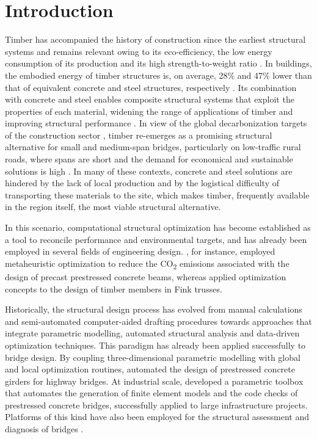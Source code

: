 \section{Introduction}\label{sec:introducao}

Timber has accompanied the history of construction since the earliest structural systems and remains relevant owing to its eco-efficiency, the low energy consumption of its production and its high strength-to-weight ratio \parencite{FRAGA2025}.
In buildings, the embodied energy of timber structures is, on average, 28\% and 47\% lower than that of equivalent concrete and steel structures, respectively \parencite{Schenk2022}.
Its combination with concrete and steel enables composite structural systems that exploit the properties of each material, widening the range of applications of timber and improving structural performance \parencite{PASTORI2022}.
In view of the global decarbonization targets of the construction sector \parencite{Li2025}, timber re-emerges as a promising structural alternative for small and medium-span bridges, particularly on low-traffic rural roads, where spans are short and the demand for economical and sustainable solutions is high \parencite{Milani2020}.
In many of these contexts, concrete and steel solutions are hindered by the lack of local production and by the logistical difficulty of transporting these materials to the site, which makes timber, frequently available in the region itself, the most viable structural alternative.

In this scenario, computational structural optimization has become established as a tool to reconcile performance and environmental targets, and has already been employed in several fields of engineering design. \textcite{Moraes2022}, for instance, employed metaheuristic optimization to reduce the CO\textsubscript{2} emissions associated with the design of precast prestressed concrete beams, whereas \textcite{FRAGA2025} applied optimization concepts to the design of timber members in Fink trusses.

Historically, the structural design process has evolved from manual calculations and semi-automated computer-aided drafting procedures towards approaches that integrate parametric modelling, automated structural analysis and data-driven optimization techniques.
This paradigm has already been applied successfully to bridge design. By coupling three-dimensional parametric modelling with global and local optimization routines, \textcite{deMoraes2025} automated the design of prestressed concrete girders for highway bridges.
At industrial scale, \textcite{Rajic2026} developed a parametric toolbox that automates the generation of finite element models and the code checks of prestressed concrete bridges, successfully applied to large infrastructure projects.
Platforms of this kind have also been employed for the structural assessment and diagnosis of bridges \parencite{Garbowski2023, Alseid2025, Miluccio2026}.

